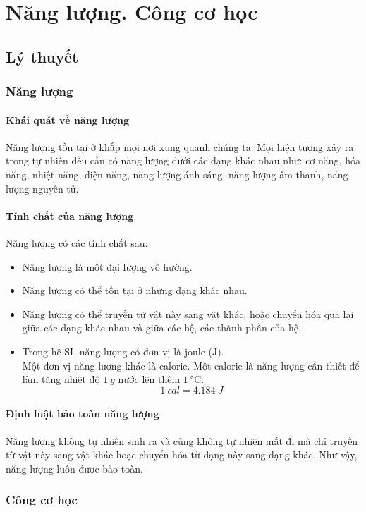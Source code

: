 \let\lesson\undefined
\newcommand{\lesson}{\phantomlesson{Bài 15: Năng lượng và công}}
\chapter[Năng lượng. Công cơ học.]{Năng lượng. Công cơ học}
\setcounter{section}{0}
\section{Lý thuyết}
\subsection{Năng lượng}
\subsubsection{Khái quát về năng lượng}
Năng lượng tồn tại ở khắp mọi nơi xung quanh chúng ta. Mọi hiện tượng xảy ra trong tự nhiên đều cần có năng lượng dưới các dạng khác nhau như: cơ năng, hóa năng, nhiệt năng, điện năng, năng lượng ánh sáng, năng lượng âm thanh, năng lượng nguyên tử.
\subsubsection{Tính chất của năng lượng}
Năng lượng có các tính chất sau:
\begin{itemize}
	\item Năng lượng là một đại lượng vô hướng.
	\item Năng lượng có thể tồn tại ở những dạng khác nhau.
	\item Năng lượng có thể truyền từ vật này sang vật khác, hoặc chuyển hóa qua lại giữa các dạng khác nhau và giữa các hệ, các thành phần của hệ.
	\item Trong hệ SI, năng lượng có đơn vị là joule (J).\\ Một đơn vị năng lượng khác là calorie. Một calorie là năng lượng cần thiết để làm tăng nhiệt độ $\SI{1}{g}$ nước lên thêm $\SI{1}{\celsius}$.
	$$\SI{1}{cal} = \SI{4.184}{J}$$
\end{itemize}
\subsubsection{Định luật bảo toàn năng lượng}
Năng lượng không tự nhiên sinh ra và cũng không tự nhiên mất đi mà chỉ truyền từ vật này sang vật khác hoặc chuyển hóa từ dạng này sang dạng khác. Như vậy, năng lượng luôn được bảo toàn.
\subsection{Công cơ học}
	
